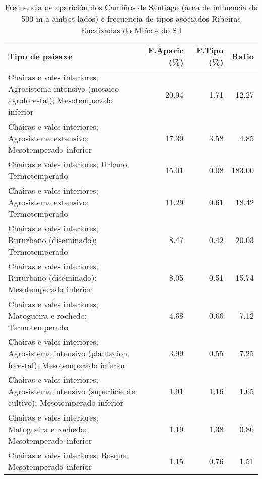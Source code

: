 \begin{table}[p]
\centering
\caption{Frecuencia de aparición dos Camiños de Santiago (área de influencia de 500 m a ambos lados) e frecuencia de tipos asociados Ribeiras Encaixadas do Miño e do Sil} 
\label{vcamino4}
\begin{tabular}{lrrr}
  \hline
Tipo de paisaxe & F.Aparic (\%) & F.Tipo (\%) & Ratio \\ 
  \hline
Chairas e vales interiores; Agrosistema intensivo (mosaico agroforestal); Mesotemperado inferior & 20.94 & 1.71 & 12.27 \\ 
  Chairas e vales interiores; Agrosistema extensivo; Mesotemperado inferior & 17.39 & 3.58 & 4.85 \\ 
  Chairas e vales interiores; Urbano; Termotemperado & 15.01 & 0.08 & 183.00 \\ 
  Chairas e vales interiores; Agrosistema extensivo; Termotemperado & 11.29 & 0.61 & 18.42 \\ 
  Chairas e vales interiores; Rururbano (diseminado); Termotemperado & 8.47 & 0.42 & 20.03 \\ 
  Chairas e vales interiores; Rururbano (diseminado); Mesotemperado inferior & 8.05 & 0.51 & 15.74 \\ 
  Chairas e vales interiores; Matogueira e rochedo; Termotemperado & 4.68 & 0.66 & 7.12 \\ 
  Chairas e vales interiores; Agrosistema intensivo (plantacion forestal); Mesotemperado inferior & 3.99 & 0.55 & 7.25 \\ 
  Chairas e vales interiores; Agrosistema intensivo (superficie de cultivo); Mesotemperado inferior & 1.91 & 1.16 & 1.65 \\ 
  Chairas e vales interiores; Matogueira e rochedo; Mesotemperado inferior & 1.19 & 1.38 & 0.86 \\ 
  Chairas e vales interiores; Bosque; Mesotemperado inferior & 1.15 & 0.76 & 1.51 \\ 
   \hline
\end{tabular}
\end{table}
